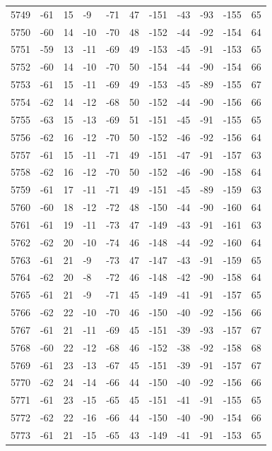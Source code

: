 \begin{table}[H]
\begin{tabular}{lllllllllll}
5749 & -61 & 15 & -9 & -71 & 47 & -151 & -43 & -93 & -155 & 65 \\
5750 & -60 & 14 & -10 & -70 & 48 & -152 & -44 & -92 & -154 & 64 \\
5751 & -59 & 13 & -11 & -69 & 49 & -153 & -45 & -91 & -153 & 65 \\
5752 & -60 & 14 & -10 & -70 & 50 & -154 & -44 & -90 & -154 & 66 \\
5753 & -61 & 15 & -11 & -69 & 49 & -153 & -45 & -89 & -155 & 67 \\
5754 & -62 & 14 & -12 & -68 & 50 & -152 & -44 & -90 & -156 & 66 \\
5755 & -63 & 15 & -13 & -69 & 51 & -151 & -45 & -91 & -155 & 65 \\
5756 & -62 & 16 & -12 & -70 & 50 & -152 & -46 & -92 & -156 & 64 \\
5757 & -61 & 15 & -11 & -71 & 49 & -151 & -47 & -91 & -157 & 63 \\
5758 & -62 & 16 & -12 & -70 & 50 & -152 & -46 & -90 & -158 & 64 \\
5759 & -61 & 17 & -11 & -71 & 49 & -151 & -45 & -89 & -159 & 63 \\
5760 & -60 & 18 & -12 & -72 & 48 & -150 & -44 & -90 & -160 & 64 \\
5761 & -61 & 19 & -11 & -73 & 47 & -149 & -43 & -91 & -161 & 63 \\
5762 & -62 & 20 & -10 & -74 & 46 & -148 & -44 & -92 & -160 & 64 \\
5763 & -61 & 21 & -9 & -73 & 47 & -147 & -43 & -91 & -159 & 65 \\
5764 & -62 & 20 & -8 & -72 & 46 & -148 & -42 & -90 & -158 & 64 \\
5765 & -61 & 21 & -9 & -71 & 45 & -149 & -41 & -91 & -157 & 65 \\
5766 & -62 & 22 & -10 & -70 & 46 & -150 & -40 & -92 & -156 & 66 \\
5767 & -61 & 21 & -11 & -69 & 45 & -151 & -39 & -93 & -157 & 67 \\
5768 & -60 & 22 & -12 & -68 & 46 & -152 & -38 & -92 & -158 & 68 \\
5769 & -61 & 23 & -13 & -67 & 45 & -151 & -39 & -91 & -157 & 67 \\
5770 & -62 & 24 & -14 & -66 & 44 & -150 & -40 & -92 & -156 & 66 \\
5771 & -61 & 23 & -15 & -65 & 45 & -151 & -41 & -91 & -155 & 65 \\
5772 & -62 & 22 & -16 & -66 & 44 & -150 & -40 & -90 & -154 & 66 \\
5773 & -61 & 21 & -15 & -65 & 43 & -149 & -41 & -91 & -153 & 65 \\

\end{tabular}
\end{table}
